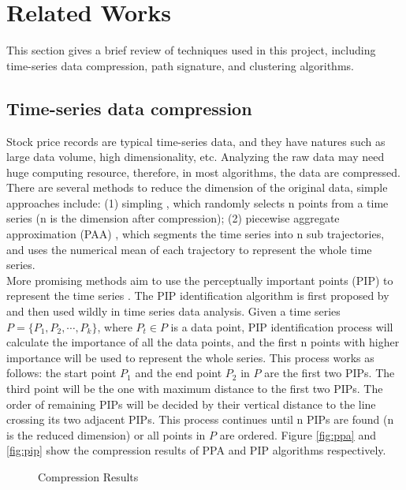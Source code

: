 \section{Related Works}
This section gives a brief review of techniques used in this project, including time-series data compression, path signature, and clustering algorithms.

\subsection{Time-series data compression}
Stock price records are typical time-series data, and they have natures such as large data volume, high dimensionality, etc. Analyzing the raw data may need huge computing resource, therefore, in most algorithms, the data are compressed. There are several methods to reduce the dimension of the original data, simple approaches include: (1) simpling \cite{aastrom1969choice}, which randomly selects n points from a time series (n is the dimension after compression); (2) piecewise aggregate approximation (PAA) \cite{keogh2001dimensionality,yi2000fast}, which segments the time series into n sub trajectories, and uses the numerical mean of each trajectory to represent the whole time series.
\\More promising methods aim to use the perceptually important points (PIP) to represent the time series \cite{fu2011review}. The PIP identification algorithm is first proposed by \cite{chung2001flexible} and then used wildly in time series data analysis. Given a time series $ P = \{P_1, P_2, \cdots, P_k\}$, where $P_t \in P$ is a data point, PIP identification process will calculate the importance of all the data points, and the first n points with higher importance will be used to represent the whole series. This process works as follows: the start point $P_1$ and the end point $P_2$ in $P$ are the first two PIPs. The third point will be the one with maximum distance to the first two PIPs. The order of remaining PIPs will be decided by their vertical distance to the line crossing its two adjacent PIPs. This process continues until n PIPs are found (n is the reduced dimension) or all points in $P$ are ordered. Figure \ref{fig:ppa} and \ref{fig:pip} show the compression results of PPA and PIP algorithms respectively.
\begin{figure}[!htbp]
    \label{fig:compression}
    \centering
    \caption{Compression Results}
\end{figure} 
 
